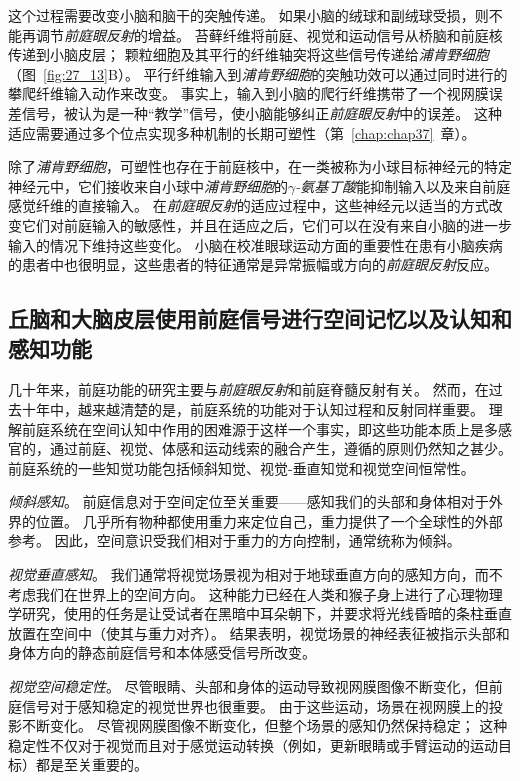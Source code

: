 这个过程需要改变小脑和脑干的突触传递。
如果小脑的绒球和副绒球受损，则不能再调节\textit{前庭眼反射}的增益。
苔藓纤维将前庭、视觉和运动信号从桥脑和前庭核传递到小脑皮层；
颗粒细胞及其平行的纤维轴突将这些信号传递给\textit{浦肯野细胞}（图~\ref{fig:27_13}B）。
平行纤维输入到\textit{浦肯野细胞}的突触功效可以通过同时进行的攀爬纤维输入动作来改变。
事实上，输入到小脑的爬行纤维携带了一个视网膜误差信号，被认为是一种“教学”信号，使小脑能够纠正\textit{前庭眼反射}中的误差。
这种适应需要通过多个位点实现多种机制的长期可塑性（第~\ref{chap:chap37}~章）。


除了\textit{浦肯野细胞}，可塑性也存在于前庭核中，在一类被称为小球目标神经元的特定神经元中，它们接收来自小球中\textit{浦肯野细胞}的\textit{$\gamma$-氨基丁酸}能抑制输入以及来自前庭感觉纤维的直接输入。
在\textit{前庭眼反射}的适应过程中，这些神经元以适当的方式改变它们对前庭输入的敏感性，并且在适应之后，它们可以在没有来自小脑的进一步输入的情况下维持这些变化。
小脑在校准眼球运动方面的重要性在患有小脑疾病的患者中也很明显，这些患者的特征通常是异常振幅或方向的\textit{前庭眼反射}反应。



\subsection{丘脑和大脑皮层使用前庭信号进行空间记忆以及认知和感知功能}

几十年来，前庭功能的研究主要与\textit{前庭眼反射}和前庭脊髓反射有关。
然而，在过去十年中，越来越清楚的是，前庭系统的功能对于认知过程和反射同样重要。
理解前庭系统在空间认知中作用的困难源于这样一个事实，即这些功能本质上是多感官的，通过前庭、视觉、体感和运动线索的融合产生，遵循的原则仍然知之甚少。
前庭系统的一些知觉功能包括倾斜知觉、视觉-垂直知觉和视觉空间恒常性。


\textit{倾斜感知}。
前庭信息对于空间定位至关重要——感知我们的头部和身体相对于外界的位置。
几乎所有物种都使用重力来定位自己，重力提供了一个全球性的外部参考。
因此，空间意识受我们相对于重力的方向控制，通常统称为倾斜。


\textit{视觉垂直感知}。
我们通常将视觉场景视为相对于地球垂直方向的感知方向，而不考虑我们在世界上的空间方向。
这种能力已经在人类和猴子身上进行了心理物理学研究，使用的任务是让受试者在黑暗中耳朵朝下，并要求将光线昏暗的条柱垂直放置在空间中（使其与重力对齐）。
结果表明，视觉场景的神经表征被指示头部和身体方向的静态前庭信号和本体感受信号所改变。


\textit{视觉空间稳定性}。
尽管眼睛、头部和身体的运动导致视网膜图像不断变化，但前庭信号对于感知稳定的视觉世界也很重要。
由于这些运动，场景在视网膜上的投影不断变化。
尽管视网膜图像不断变化，但整个场景的感知仍然保持稳定；
这种稳定性不仅对于视觉而且对于感觉运动转换（例如，更新眼睛或手臂运动的运动目标）都是至关重要的。



